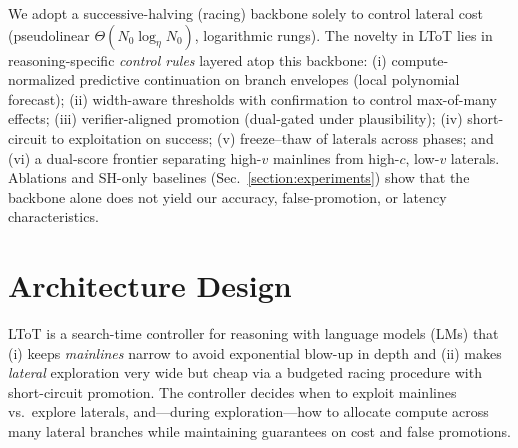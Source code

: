 \documentclass{article}
\begin{document}
We adopt a successive-halving (racing) backbone solely to control lateral cost (pseudolinear $\Theta(N_0\log_\eta N_0)$, logarithmic rungs).
The novelty in LToT lies in reasoning-specific \emph{control rules} layered atop this backbone:
(i) compute-normalized predictive continuation on branch envelopes (local polynomial forecast);
(ii) width-aware thresholds with confirmation to control max-of-many effects;
(iii) verifier-aligned promotion (dual-gated under plausibility);
(iv) short-circuit to exploitation on success;
(v) freeze--thaw of laterals across phases; and
(vi) a dual-score frontier separating high-$v$ mainlines from high-$c$, low-$v$ laterals.
Ablations and SH-only baselines (Sec.~\ref{section:experiments}) show that the backbone alone does not yield our accuracy, false-promotion, or latency characteristics.

\begin{table*}[t]
\centering
\small
{}
\caption{Cross-walk: LToT control rules vs.\ racing backbones.}
\end{table*}
\section{Architecture Design}
\label{section:architecture-design}

LToT is a search-time controller for reasoning with language models (LMs) that
(i) keeps \emph{mainlines} narrow to avoid exponential blow-up in depth and
(ii) makes \emph{lateral} exploration very wide but cheap via a budgeted racing procedure with short-circuit promotion.
The controller decides when to exploit mainlines vs.\ explore laterals, and—during exploration—how to allocate compute across many lateral branches while maintaining guarantees on cost and false promotions.
\end{document}

